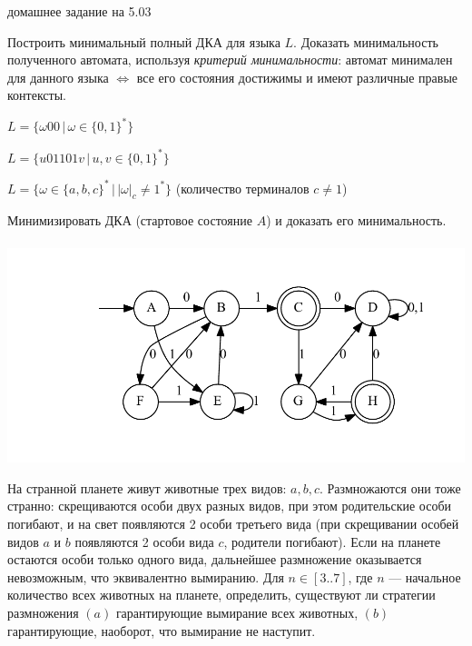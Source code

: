 \documentclass[12pt]{article}
\begin{document}

{\Large домашнее задание на 5.03}
\bigskip

\enumerate
{
  \item
  { Построить минимальный полный ДКА для языка $L$. Доказать минимальность полученного автомата, используя \textit{критерий минимальности}: автомат минимален для данного языка $\Leftrightarrow$ все его состояния достижимы и имеют различные правые контексты. 
    \enumerate 
    {
      \item $L = \{\omega 0 0 \, | \, \omega \in \{0,1\}^*\} $
      \item $L = \{u 01101 v \, | \, u, v \in \{0,1\}^*\} $
      \item $L = \{\omega  \in \{a,b,c\}^* \, | \, |\omega|_c \neq 1 ^*\} $ (количество терминалов $c \neq 1$)
  
    }
  }
  \item Минимизировать ДКА (стартовое состояние $A$) и доказать его минимальность. 
    ~\\~{ \includegraphics[width=\linewidth]{1.pdf} }
  \item На странной планете живут животные трех видов: $a, b, c$. Размножаются они тоже странно: скрещиваются особи двух разных видов, при этом родительские особи погибают, и на свет появляются 2 особи третьего вида (при скрещивании особей видов $a$ и $b$ появляются 2 особи вида $c$, родители погибают). Если на планете остаются особи только одного вида, дальнейшее размножение оказывается невозможным, что эквивалентно вымиранию. Для $n \in [3..7]$, где $n$ --- начальное количество всех животных на планете, определить, существуют ли стратегии размножения $(a)$ гарантирующие вымирание всех животных, $(b)$ гарантирующие, наоборот, что вымирание не наступит. 
}

\end{document}
